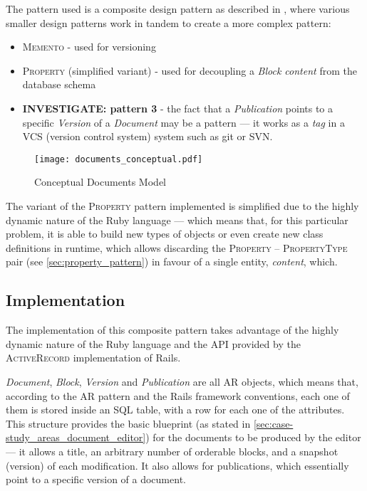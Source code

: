 The pattern used is a composite design pattern as described in \cite{riehle_composite_patterns}, where various smaller design patterns work in tandem to create a more complex pattern:

\begin{itemize}
  \item \textsc{Memento} - used for versioning
  \item \textsc{Property} (simplified variant) - used for decoupling a \emph{Block content} from the database schema
  \item \textbf{INVESTIGATE: pattern 3} - the fact that a \emph{Publication} points to a specific \emph{Version} of a \emph{Document} may be a pattern --- it works as a \emph{tag} in a VCS (version control system) system such as git or SVN.
\end{itemize}

\begin{figure}[H]
  \centering
  \texttt{[image: documents\_conceptual.pdf]}
  \caption{Conceptual Documents Model}
  \label{fig:documents_conceptual}
\end{figure}

The variant of the \textsc{Property} pattern implemented is simplified due to the highly dynamic nature of the Ruby language --- which means that, for this particular problem, it is able to build new types of objects or even create new class definitions in runtime, which allows discarding the \textsc{Property} -- \textsc{PropertyType} pair (see \ref{sec:property_pattern}) in favour of a single entity, \emph{content}, which.

\subsection{Implementation}\label{sec:fa_documents_implementation}

The implementation of this composite pattern takes advantage of the highly dynamic nature of the Ruby language and the API provided by the \textsc{ActiveRecord} implementation of Rails.

\emph{Document}, \emph{Block}, \emph{Version} and \emph{Publication} are all AR objects, which means that, according to the AR pattern and the Rails framework conventions, each one of them is stored inside an SQL table, with a row for each one of the attributes. This structure provides the basic blueprint (as stated in \ref{sec:case-study_areas_document_editor}) for the documents to be produced by the editor --- it allows a title, an arbitrary number of orderable blocks, and a snapshot (version) of each modification. It also allows for publications, which essentially point to a specific version of a document.

